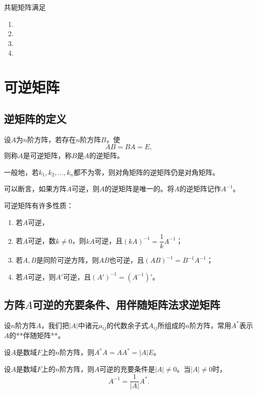 共轭矩阵满足
\begin{enumerate}
    \item %
    \item %
    \item %
    \item %
\end{enumerate}


\section{可逆矩阵}

\subsection{逆矩阵的定义}
\begin{definition}
设$A$为$n$阶方阵，若存在$n$阶方阵$B$，使
\[
AB=BA=E,
\]
则称$A$是可逆矩阵，称$B$是$A$的逆矩阵。
\end{definition}

一般地，若$k_1,k_2,\dots,k_n$都不为零，则对角矩阵的逆矩阵仍是对角矩阵。

可以断言，如果方阵$A$可逆，则$A$的逆矩阵是唯一的。将$A$的逆矩阵记作$A^{-1}$。

可逆矩阵有许多性质：
\begin{enumerate}
    \item 若$A$可逆，%
    \item 若$A$可逆，数$k\neq0$，则$kA$可逆，且$(kA)^{-1}=\dfrac{1}{k}A^{-1}$；
    \item 若$A,B$是同阶可逆方阵，则$AB$也可逆，且$(AB)^{-1}=B^{-1}A^{-1}$；
    \item 若$A$可逆，则$A'$可逆，且$(A')^{-1}=(A^{-1})'$。
\end{enumerate}

\subsection{方阵$A$可逆的充要条件、用伴随矩阵法求逆矩阵}
设$n$阶方阵$A$，我们把$|A|$中诸元$a_{ij}$的代数余子式$A_{ij}$所组成的$n$阶方阵，常用$A^*$表示$A$的**伴随矩阵**。

\begin{lemma}
设$A$是数域$F$上的$n$阶方阵，则$A^*A=AA^*=|A|E$。
\end{lemma}

\begin{theorem}
设$A$是数域$F$上的$n$阶方阵，则$A$可逆的充要条件是$|A|\neq0$。当$|A|\neq0$时，
\[
A^{-1}=\frac{1}{|A|}A^*.
\]
\end{theorem}

